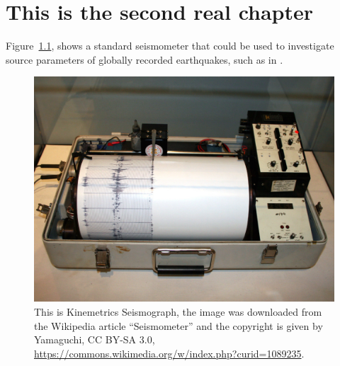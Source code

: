 \chapter{This is the second real chapter}

\lipsum[5-6]

Figure~\ref{fig:seismometer}, shows a standard seismometer that could be used to investigate source parameters of globally recorded earthquakes, such as in \cite{Dziewonski1983}.


\begin{figure}
	\includegraphics[width=\textwidth]{chapters/chapter2/figures/Kinemetrics_seismograph.jpg}
	\caption{This is Kinemetrics Seismograph, the image was downloaded from the Wikipedia article ``Seismometer'' and the copyright is given by Yamaguchi, CC BY-SA 3.0, \url{https://commons.wikimedia.org/w/index.php?curid=1089235}.}
	\label{fig:seismometer}
\end{figure}

\lipsum[7-8]



